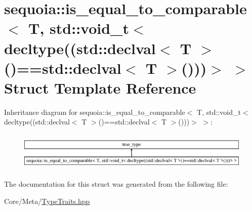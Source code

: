 \hypertarget{structsequoia_1_1is__equal__to__comparable_3_01_t_00_01std_1_1void__t_3_01decltype_07_07std_1_1ded2f377db75fb1abb86e3e07113b5271}{}\section{sequoia\+::is\+\_\+equal\+\_\+to\+\_\+comparable$<$ T, std\+::void\+\_\+t$<$ decltype((std\+::declval$<$ T $>$()==std\+::declval$<$ T $>$()))$>$ $>$ Struct Template Reference}
\label{structsequoia_1_1is__equal__to__comparable_3_01_t_00_01std_1_1void__t_3_01decltype_07_07std_1_1ded2f377db75fb1abb86e3e07113b5271}
Inheritance diagram for sequoia\+::is\+\_\+equal\+\_\+to\+\_\+comparable$<$ T, std\+::void\+\_\+t$<$ decltype((std\+::declval$<$ T $>$()==std\+::declval$<$ T $>$()))$>$ $>$\+:\begin{figure}[H]
\begin{center}
\leavevmode
\includegraphics[height=1.860465cm]{structsequoia_1_1is__equal__to__comparable_3_01_t_00_01std_1_1void__t_3_01decltype_07_07std_1_1ded2f377db75fb1abb86e3e07113b5271}
\end{center}
\end{figure}


The documentation for this struct was generated from the following file\+:\begin{DoxyCompactItemize}
\item 
Core/\+Meta/\mbox{\hyperlink{_type_traits_8hpp}{Type\+Traits.\+hpp}}\end{DoxyCompactItemize}
